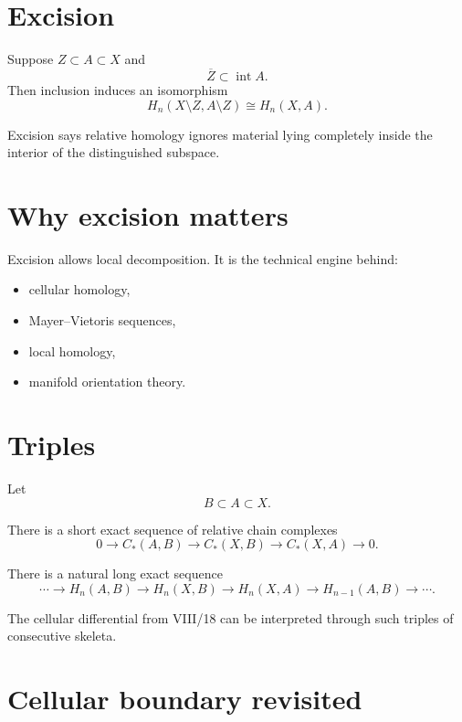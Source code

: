 \section{Excision}

\begin{theorem}[Excision]
\label{thm:viii19-excision}
Suppose \(Z\subset A\subset X\) and
\[
\overline Z\subset \operatorname{int}A.
\]
Then inclusion induces an isomorphism
\[
H_n(X\setminus Z,A\setminus Z)
\cong
H_n(X,A).
\]
\end{theorem}

Excision says relative homology ignores material lying completely inside the
interior of the distinguished subspace.

\section{Why excision matters}

Excision allows local decomposition.  It is the technical engine behind:
\begin{itemize}
\item cellular homology,
\item Mayer--Vietoris sequences,
\item local homology,
\item manifold orientation theory.
\end{itemize}

\section{Triples}

Let
\[
B\subset A\subset X.
\]

There is a short exact sequence of relative chain complexes
\[
0\to C_*(A,B)\to C_*(X,B)\to C_*(X,A)\to0.
\]

\begin{theorem}
\label{thm:viii19-les-triple}
There is a natural long exact sequence
\[
\cdots
\to H_n(A,B)
\to H_n(X,B)
\to H_n(X,A)
\to H_{n-1}(A,B)
\to\cdots.
\]
\end{theorem}

The cellular differential from VIII/18 can be interpreted through such triples
of consecutive skeleta.

\section{Cellular boundary revisited}

